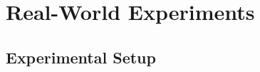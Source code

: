 \documentclass[letterpaper, 10 pt, conference]{ieeeconf}  %
\newcommand{\hanote}[1]{{\xxnote{HA}{red}{#1}}} %
\newcommand{\xxnote}[3]{}
\renewcommand{\xxnote}[3]{\color{#2}{#1: #3}}
\begin{document}
%     
    

\section{Real-World Experiments} \label {sec:results_r}


\subsection{Experimental Setup}

\end{document}
